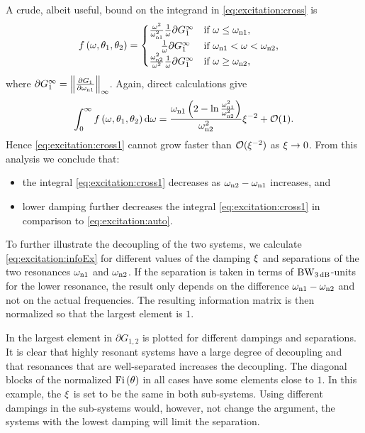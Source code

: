 A crude, albeit useful, bound on the integrand in \eqref{eq:excitation:cross} is
\begin{align}
&f\left(\omega,\theta_1,\theta_2\right)=
  \begin{cases}
   \frac{\omega^2}{\wn[1]^2}
   \frac{1}{\omega}
   \partial G_1^\infty
                                       & \text{if $\omega \leq \wn[1]$,}\\
   \phantom{\frac{\omega^2}{\omega^2}}
   \frac{1}{\omega}
   \partial G_1^\infty
                                       & \text{if $\wn[1] < \omega < \wn[2]$,}\\
   \frac{\wn[2]^2}{\omega^2}
   \frac{1}{\omega}
   \partial G_1^\infty
                                       & \text{if $\omega \geq \wn[2]$,}
  \end{cases}
\end{align}
where $\partial G_1^\infty = \left\|\frac{\partial G_1}{\partial \wn[1]}\right\|_\infty$. 
Again, direct calculations give
\begin{align}
\int_0^\infty f\left(\omega,\theta_1,\theta_2\right)\dd\omega = \frac{\wn[1]\left(2-\ln{\frac{\wn[1]^2}{\wn[2]^2}}\right)}{\wn[2]^2}\damping^{-2} + \mathcal{O}(1).
\end{align}
Hence \eqref{eq:excitation:cross1} cannot grow faster than $\mathcal{O}(\damping^{-2})$ as $\damping\rightarrow0$. From this analysis we conclude that:
\begin{itemize}
\item the integral \eqref{eq:excitation:cross1} decreases as $\wn[2]-\wn[1]$ increases, and
\item lower damping further decreases the integral \eqref{eq:excitation:cross1} in comparison to \eqref{eq:excitation:auto}.
\end{itemize}

To further illustrate the decoupling of the two systems, we calculate \eqref{eq:excitation:infoEx} for different values of the damping $\damping$ and separations of the two resonances $\wn[1]$ and $\wn[2]$. If the separation is taken in terms of $\wdB$-units for the lower resonance, the result only depends on the difference $\wn[1]-\wn[2]$ and not on the actual frequencies. The resulting information matrix is then normalized so that the largest element is $1$.

In  the largest element in $\partial G_{1,2}$ is plotted for different dampings and separations. It is clear that highly resonant systems have a large degree of decoupling and that resonances that are well-separated increases the decoupling. 
The diagonal blocks of the normalized $\IF$ in all cases have some elements close to $1$. 
In this example, the $\damping$ is set to be the same in both sub-systems. 
Using different dampings in the sub-systems would, however, not change the argument, the systems with the lowest damping will limit the separation.

